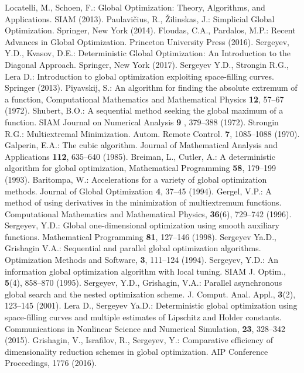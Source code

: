 \documentclass[runningheads]{llncs}
\begin{document}
\begin{thebibliography}{1}
 Locatelli, M., Schoen, F.: Global Optimization: Theory, Algorithms, and Applications. SIAM (2013).
 Paulavi{\v c}ius, R., {\v Z}ilinskas, J.: Simplicial Global Optimization. Springer, New York (2014). 
 Floudas, C.A., Pardalos, M.P.: Recent Advances in Global Optimization. Princeton University Press (2016).
 Sergeyev, Y.D., Kvasov, D.E.: Deterministic Global Optimization: An Introduction to the Diagonal Approach. Springer, New York (2017). 
 Sergeyev Y.D., Strongin R.G., Lera D.: Introduction to global optimization exploiting space-filling curves. Springer (2013).
 Piyavskij, S.: An algorithm for finding the absolute extremum of a function, Computational Mathematics and Mathematical Physics \textbf{12}, 57--67 (1972).
 Shubert, B.O.: A sequential method seeking the global maximum of a function. SIAM Journal on Numerical Analysis \textbf{9} , 379--388 (1972).
 Strongin R.G.: Multiextremal Minimization. Autom. Remote Control. \textbf{7}, 1085--1088 (1970).
 Galperin, E.A.: The cubic algorithm. Journal of Mathematical Analysis and Applications \textbf{112}, 635--640 (1985).
 Breiman, L., Cutler, A.: A deterministic algorithm for global optimization, Mathematical Programming \textbf{58}, 179--199 (1993).
 Baritompa, W.: Accelerations for a variety of global optimization methods. Journal of Global Optimization \textbf{4}, 37--45 (1994).
 Gergel, V.P.: A method of using derivatives in the minimization of multiextremum functions. Computational Mathematics and Mathematical Physics, \textbf{36}(6), 729--742 (1996).
 Sergeyev, Y.D.: Global one-dimensional optimization using smooth auxiliary functions. Mathematical Programming \textbf{81}, 127--146 (1998).
 Sergeyev Ya.D., Grishagin V.A.: Sequential and parallel global optimization algorithms. Optimization Methods and Software, \textbf{3}, 111--124 (1994).
 Sergeyev, Y.D.: An information global optimization algorithm with local tuning. SIAM J. Optim., \textbf{5}(4), 858--870 (1995).
 Sergeyev, Y.D., Grishagin, V.A.: Parallel asynchronous global search and the nested optimization scheme. J. Comput. Anal. Appl., \textbf{3}(2), 123--145 (2001).
 Lera D., Sergeyev Ya.D.: Deterministic global optimization using space-filling curves and multiple estimates of Lipschitz and Holder constants. Communications in Nonlinear Science and Numerical Simulation, \textbf{23}, 328--342 (2015).
 Grishagin, V., Israfilov, R., Sergeyev, Y.: Comparative efficiency of dimensionality reduction schemes in global optimization. AIP Conference Proceedings, 1776 (2016).

\end{thebibliography}
\end{document}
